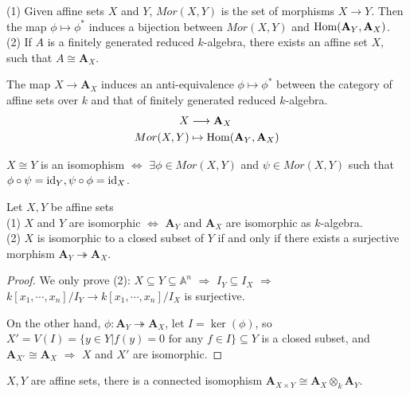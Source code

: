 \begin{prop}
	(1) Given affine sets $X$ and $Y$, $Mor(X,Y)$ is the set of morphisms $X\longrightarrow Y$. Then the map $\phi \mapsto \phi^*$ induces a bijection between $Mor(X,Y)$ and $\mathop{\mathrm{Hom}}(\mathbf{A}_Y,\mathbf{A}_X)$.\\
	(2) If $A$ is a finitely generated reduced $k$-algebra, there exists an affine set $X$, such that $A\cong \mathbf{A}_X.$
\end{prop}
\begin{corollary}
	The map $X\longrightarrow \mathbf{A}_X$ induces an anti-equivalence $\phi \mapsto \phi^*$ between the category of affine sets over $k$ and that of finitely generated reduced $k$-algebra.
	\begin{align*}
		X &\longrightarrow \mathbf{A}_X \\
		Mor(X,Y) &\mapsto \mathop{\mathrm{Hom}}(\mathbf{A}_Y,\mathbf{A}_X)
	\end{align*}
\end{corollary}
\begin{definition}
	$X\cong Y$ is an isomophism $\Longleftrightarrow$ $\exists \phi \in Mor(X,Y)$ and $\psi \in Mor(X,Y)$ such that $\phi \circ \psi = \mathrm{id}_Y, \psi \circ \phi =\mathrm{id}_X$.
\end{definition}
\begin{corollary}
	Let $X,Y$ be affine sets\\
	(1) $X$ and $Y$ are isomorphic $\Longleftrightarrow$ $\mathbf{A}_Y$ and $\mathbf{A}_X$ are isomorphic as $k$-algebra.\\
	(2) $X$ is isomorphic to a closed subset of $Y$ if and only if there exists a surjective morphism $\mathbf{A}_Y\twoheadrightarrow\mathbf{A}_X$.
\end{corollary}
\begin{proof}
	We only prove (2): $X\subseteq Y \subseteq \mathbb{A}^n$ $\Rightarrow$ $I_Y\subseteq I_X$ $\Rightarrow$ $k[x_1,\cdots,x_n]/I_Y \longrightarrow k[x_1,\cdots,x_n]/I_X$ is surjective.

	On the other hand, $\phi\colon \mathbf{A}_Y\twoheadrightarrow \mathbf{A}_X$, let $I=\ker(\phi)$, so $X'=V(I)=\{y\in Y | f(y)=0 \mbox{ for any } f\in I \}\subseteq Y $ is a closed subset, and $\mathbf{A}_{X'}\cong \mathbf{A}_{X}$ $\Rightarrow$ $X$ and $X'$ are isomorphic.
\end{proof}
\begin{lemma}
	$X,Y$ are affine sets, there is a connected isomophism $\mathbf{A}_{X\times Y}\cong \mathbf{A}_{X} \otimes_k \mathbf{A}_{Y}$.
\end{lemma}
